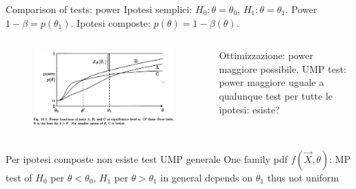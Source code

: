 \documentclass[asd-beamer.tex]{subfiles}%
\begin{document}
\begin{frame}{Comparison of tests: power}
Ipotesi semplici: $H_0: \theta=\theta_0$, $H_1: \theta=\theta_1$. Power $1-\beta=p(\theta_1)$.
Ipotesi composte: $p(\theta)=1-\beta(\theta)$.
\begin{columns}[T]
\begin{column}{0.4\textwidth}
\begin{figure}[!ht]\includegraphics[trim={0cm 0cm 0 0},clip, keepaspectratio,width=0.99\textwidth]{figures/james/test/mostpower}\label{fig:mostpower}
\end{figure}
\end{column}
\begin{column}{0.6\textwidth}
\begin{block}{Ottimizzazione: power maggiore possibile.}
	UMP test: power maggiore uguale a qualunque test per tutte le ipotesi: esiste?
\end{block}
\end{column}
\end{columns}
\begin{block}{Per ipotesi composte non esiste test UMP generale}
	One family pdf $f(\vec{X},\theta)$: MP test of $H_0$ per $\theta<\theta_0$, $H_1$ per $\theta>\theta_1$ in general depends on $\theta_1$ thus not uniform
\end{block}
\end{frame}
\end{document}
